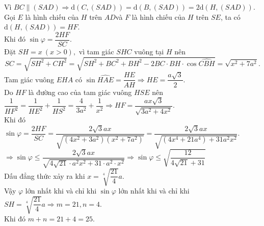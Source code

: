 \begin{vd}[VDC]
{		Vì $BC \parallel(SAD)\Rightarrow \mathrm{d}(C,(SAD))=\mathrm{d}(B,(SAD) )=2\mathrm{d}(H,(SAD))$.\\
		Gọi $E$ là hình chiếu của $H$ trên $AD$và $F$ là hình chiếu của $H$ trên $SE$,
		ta có $\mathrm{d}(H,(SAD) )=HF$.\\
		Khi đó $\sin \varphi =\dfrac {2HF}{SC}$.\\
		Đặt $SH=x~(x>0),$ vì tam giác $SHC$ vuông tại $H$ nên $$SC=\sqrt {SH^2+CH^2}=\sqrt {SH^2+BC^2+BH^2-2BC\cdot BH\cdot \cos\widehat{CBH}}=\sqrt {x^2+7a^2}.$$
		Tam giác vuông $EHA$ có $\sin \widehat{HAE}=\dfrac {HE}{AH}\Rightarrow HE=\dfrac {a\sqrt {3}}{2}$.\\
		Do $HF$ là đường cao của tam giác vuông $HSE$ nên $\dfrac {1}{HF^2}=\dfrac {1}{HE^2}+\dfrac {1}{HS^2}=\dfrac {4}{3a^2}+\dfrac {1}{x^2}\Rightarrow HF=\dfrac {ax\sqrt {3}}{\sqrt {3a^2+4x^2}}$.\\
		Khi đó
		$\sin \varphi =\dfrac {2HF}{SC}=\dfrac {2\sqrt {3}ax}{\sqrt {(4x^2+3a^2)(x^2+7a^2)}}=\dfrac {2\sqrt {3}ax}{\sqrt {(4x^4+21a^4)+31a^2x^2}}$.\\
		$\Rightarrow \sin \varphi \le \dfrac {2\sqrt {3}ax}{\sqrt {4\sqrt {21}\cdot a^2x^2+31\cdot a^2\cdot x^2}}\Rightarrow \sin \varphi \le \sqrt {\dfrac {12}{4\sqrt {21}+31}} $\\
		Dấu đẳng thức xảy ra khi $ x=\sqrt [4]{\dfrac {21}{4}}a$.\\
		Vậy $\varphi $ lớn nhất khi và chỉ khi $\sin \varphi $ lớn nhất khi và chỉ khi $SH=\sqrt [4]{\dfrac {21}{4}}a\Rightarrow m=21,n=4$.\\
		Khi đó $ m+n=21+4=25$.
	}
\end{vd}
